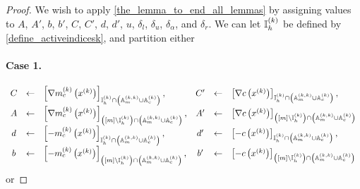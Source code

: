 \begin{proof}
We wish to apply \cref{the_lemma_to_end_all_lemmas} by assigning values to
$A$, $A'$, $b$, $b'$, $C$, $C'$, $d$, $d'$, $u$, $\delta_l$, $\delta_u$, $\delta_{\alpha}$, and $\delta_r$.
We can let ${ \mathbb I_h^{(k)} }$ be defined by \cref{define_activeindicesk}, and partition either

\paragraph*{Case 1.}
\begin{align*}
\begin{array}{cclccl}
C  &\gets& \left[\nabla m^{(k)}_c\left(x^{(k)}\right)\right]_{{ \mathbb I_h^{(k)} } \cap \left({\mathbb A_m^{(k, k)}} \cup {\mathbb A_c^{(k)}}\right)}, &
C' &\gets& \left[\nabla c\left(x^{(k)}\right)\right]_{{ \mathbb I_h^{(k)} } \cap \left({\mathbb A_m^{(k, k)}} \cup {\mathbb A_c^{(k)}}\right)}, \\
A  &\gets& \left[\nabla m^{(k)}_c\left(x^{(k)}\right)\right]_{\left([m] \setminus { \mathbb I_h^{(k)} }\right) \cap \left({\mathbb A_m^{(k, k)}} \cup {\mathbb A_c^{(k)}}\right)}, &
A' &\gets& \left[\nabla c\left(x^{(k)}\right)\right]_{\left([m] \setminus { \mathbb I_h^{(k)} }\right) \cap \left({\mathbb A_m^{(k, k)}} \cup {\mathbb A_c^{(k)}}\right)} \\
d  &\gets& \left[-m^{(k)}_c\left(x^{(k)}\right)\right]_{{ \mathbb I_h^{(k)} } \cap \left({\mathbb A_m^{(k, k)}} \cup {\mathbb A_c^{(k)}}\right)}, &
d' &\gets& \left[-c\left(x^{(k)}\right)\right]_{{ \mathbb I_h^{(k)} } \cap \left({\mathbb A_m^{(k, k)}} \cup {\mathbb A_c^{(k)}}\right)}, \\
b  &\gets& \left[-m^{(k)}_c\left(x^{(k)}\right)\right]_{\left([m] \setminus { \mathbb I_h^{(k)} }\right) \cap \left({\mathbb A_m^{(k, k)}} \cup {\mathbb A_c^{(k)}}\right)}, &
b' &\gets& \left[-c\left(x^{(k)}\right)\right]_{\left([m] \setminus { \mathbb I_h^{(k)} }\right) \cap \left({\mathbb A_m^{(k, k)}} \cup {\mathbb A_c^{(k)}}\right)} \\
\end{array}
\end{align*}
or

\end{proof}

